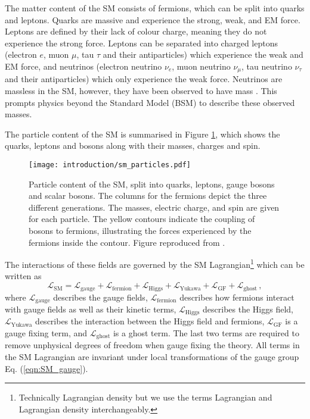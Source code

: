 \documentclass[main.tex]{subfiles}
\begin{document}
    The matter content of the SM consists of fermions, which can be split
    into quarks and leptons. Quarks are massive and experience the strong,
    weak, and EM force. Leptons are defined by their lack of colour charge,
    meaning they do not experience the strong force. Leptons can be separated
    into charged leptons (electron $e$, muon $\mu$, tau $\tau$
    and their antiparticles) which experience the weak and EM force, and 
    neutrinos (electron neutrino $\nu_{e}$, muon neutrino $\nu_{\mu}$, tau
    neutrino $\nu_{\tau}$ and their antiparticles) which only experience the
    weak force. Neutrinos are massless in the SM, however, they have been
    observed to have mass \cite{Super-Kamiokande:1998kpq,SNO:2002tuh}. This
    prompts physics beyond the Standard Model (BSM) to describe these observed masses.

    The particle content of the SM is summarised in Figure \ref{fig:SM_particles},
    which shows the quarks, leptons and bosons along with their masses, charges
    and spin.
    \begin{figure}
        \texttt{[image: introduction/sm\_particles.pdf]}
        \caption{Particle content of the SM, split into quarks, leptons,
        gauge bosons and scalar bosons. The columns for the fermions depict
        the three different generations. The masses, electric charge, and spin
        are given for each particle. The yellow contours indicate the coupling
        of bosons to fermions, illustrating the forces experienced by the
        fermions inside the contour. Figure reproduced from \cite{SM_figure}.}
        \label{fig:SM_particles}
    \end{figure}
    The interactions of these fields are governed by the SM Lagrangian\footnote{Technically Lagrangian density but we use the terms
    Lagrangian and Lagrangian density interchangeably.}
    which can be written as
    \begin{equation}\label{eqn:L_SM}
        \mathcal{L}_{\mathrm{SM}} = \mathcal{L}_{\mathrm{gauge}} + \mathcal{L}_{\mathrm{fermion}} + \mathcal{L}_{\mathrm{Higgs}} + \mathcal{L}_{\mathrm{Yukawa}} + \mathcal{L}_{\mathrm{GF}} + \mathcal{L}_{\mathrm{ghost}} \, ,
    \end{equation}
    where $\mathcal{L}_{\mathrm{gauge}}$ describes the gauge fields,
    $\mathcal{L}_{\mathrm{fermion}}$ describes how fermions interact with
    gauge fields as well as their kinetic terms,
    $\mathcal{L}_{\mathrm{Higgs}}$ describes the Higgs field,
    $\mathcal{L}_{\mathrm{Yukawa}}$ describes the interaction between the Higgs
    field and fermions,
    $\mathcal{L}_{\mathrm{GF}}$ is a gauge fixing term,
    and $\mathcal{L}_{\mathrm{ghost}}$ is a ghost term.
    The last two terms are required to remove unphysical degrees of freedom
    when gauge fixing the theory.
    All terms in the SM Lagrangian are invariant under local transformations
    of the gauge group Eq. (\ref{eqn:SM_gauge}).
\end{document}
